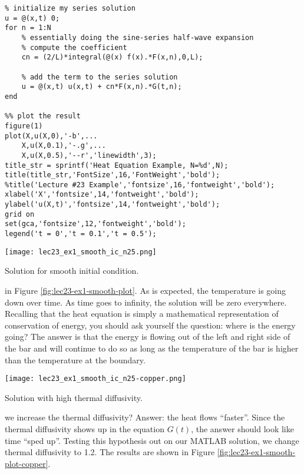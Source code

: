 \begin{lstlisting}[name=lec23_ex1, style=myMatlab]
%% Compute the solution
% initialize my series solution
u = @(x,t) 0;
for n = 1:N
    % essentially doing the sine-series half-wave expansion
    % compute the coefficient
    cn = (2/L)*integral(@(x) f(x).*F(x,n),0,L);
    
    % add the term to the series solution
    u = @(x,t) u(x,t) + cn*F(x,n).*G(t,n);
end

%% plot the result
figure(1)
plot(X,u(X,0),'-b',...
    X,u(X,0.1),'-.g',...
    X,u(X,0.5),'--r','linewidth',3);
title_str = sprintf('Heat Equation Example, N=%d',N);
title(title_str,'FontSize',16,'FontWeight','bold');
%title('Lecture #23 Example','fontsize',16,'fontweight','bold');
xlabel('X','fontsize',14,'fontweight','bold');
ylabel('u(X,t)','fontsize',14,'fontweight','bold');
grid on
set(gca,'fontsize',12,'fontweight','bold');
legend('t = 0','t = 0.1','t = 0.5');
\end{lstlisting}
\begin{marginfigure}
\texttt{[image: lec23\_ex1\_smooth\_ic\_n25.png]}
\caption{Solution for smooth initial condition.}
\label{fig:lec23-ex1-smooth-plot}
\end{marginfigure}
 in Figure \ref{fig:lec23-ex1-smooth-plot}. As is expected, the temperature is going down over time. As time goes to infinity, the solution will be zero everywhere.  Recalling that the heat equation is simply a mathematical representation of conservation of energy, you should ask yourself the question: where is the energy going?  The answer is that the energy is flowing out of the left and right side of the bar and will continue to do so as long as the temperature of the bar is higher than the temperature at the boundary.

\begin{marginfigure}
\texttt{[image: lec23\_ex1\_smooth\_ic\_n25-copper.png]}
\caption{Solution with high thermal diffusivity.}
\label{fig:lec23-ex1-smooth-plot-copper}
\end{marginfigure}
 we increase the thermal diffusivity?  Answer: the heat flows ``faster''.  Since the thermal diffusivity shows up in the equation $G(t)$, the answer should look like time ``sped up''.  Testing this hypothesis out on our MATLAB solution, we change thermal diffusivity to 1.2.  The results are shown in Figure \ref{fig:lec23-ex1-smooth-plot-copper}.

